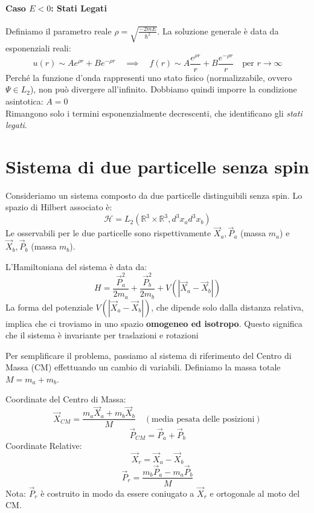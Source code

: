 \paragraph{Caso $E < 0$: Stati Legati}
Definiamo il parametro reale $\rho = \sqrt{\frac{-2mE}{\hbar^2}}$. La soluzione generale è data da esponenziali reali:
\begin{equation}
    u(r) \sim A e^{\rho r} + B e^{-\rho r} \quad \implies \quad f(r) \sim A \frac{e^{\rho r}}{r} + B \frac{e^{-\rho r}}{r} \quad \text{per } r \to \infty
\end{equation}
Perché la funzione d'onda rappresenti uno stato fisico (normalizzabile, ovvero $\Psi \in L_2$), non può divergere all'infinito.
Dobbiamo quindi imporre la condizione asintotica: \(A = 0\)\\
Rimangono solo i termini esponenzialmente decrescenti, che identificano gli \textit{stati legati}.



\section{Sistema di due particelle senza spin}

Consideriamo un sistema composto da due particelle distinguibili senza spin. Lo spazio di Hilbert associato è:
\[
\mathcal{H} = L_2(\mathbb{R}^3 \times \mathbb{R}^3, d^3x_a d^3x_b)
\]
Le osservabili per le due particelle sono rispettivamente $\vec{X}_a, \vec{P}_a$ (massa $m_a$) e $\vec{X}_b, \vec{P}_b$ (massa $m_b$).

L'Hamiltoniana del sistema è data da:
\begin{equation}
    H = \frac{\vec{P}_a^2}{2m_a} + \frac{\vec{P}_b^2}{2m_b} + V(|\vec{X}_a - \vec{X}_b|)
\end{equation}
La forma del potenziale $V(|\vec{X}_a - \vec{X}_b|)$, che dipende solo dalla distanza relativa, implica che ci troviamo in uno spazio \textbf{omogeneo ed isotropo}. 
Questo significa che il sistema è invariante per traslazioni e rotazioni

Per semplificare il problema, passiamo al sistema di riferimento del Centro di Massa (CM) effettuando un cambio di variabili.
Definiamo la massa totale $M = m_a + m_b$.

Coordinate del Centro di Massa:
\begin{equation}
    \vec{X}_{CM} = \frac{m_a \vec{X}_a + m_b \vec{X}_b}{M} \quad (\text{media pesata delle posizioni})
\end{equation}
\begin{equation}
    \vec{P}_{CM} = \vec{P}_a + \vec{P}_b
\end{equation}
Coordinate Relative:
\begin{equation}
    \vec{X}_r = \vec{X}_a - \vec{X}_b
\end{equation}
\begin{equation}
    \vec{P}_r = \frac{m_b \vec{P}_a - m_a \vec{P}_b}{M}
\end{equation}
Nota: $\vec{P}_r$ è costruito in modo da essere coniugato a $\vec{X}_r$ e ortogonale al moto del CM.

